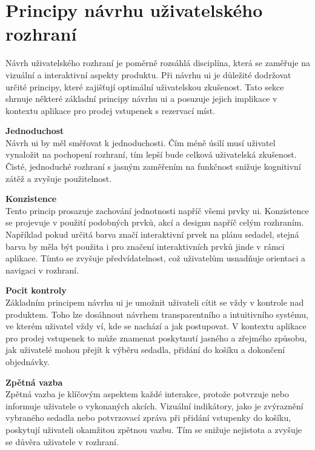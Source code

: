 \section{Principy návrhu uživatelského rozhraní}
\label{sec:navrh-uzivatelskeho-rozhrani-principy}
Návrh uživatelského rozhraní je poměrně rozsáhlá disciplína, která se zaměřuje na vizuální a interaktivní aspekty produktu.
Při návrhu \ac{ui} je důležité dodržovat určité principy, které zajišťují optimální uživatelskou zkušenost.
Tato sekce shrnuje některé základní principy návrhu \ac{ui} a posuzuje jejich implikace v kontextu aplikace pro prodej vstupenek s rezervací míst.

\textbf{Jednoduchost}\\
Návrh \ac{ui} by měl směřovat k jednoduchosti.
Čím méně úsilí musí uživatel vynaložit na pochopení rozhraní, tím lepší bude celková uživatelská zkušenost.
Čisté, jednoduché rozhraní s jasným zaměřením na funkčnost snižuje kognitivní zátěž a zvyšuje použitelnost\cite{d_resources_ui_design_principles}.

\textbf{Konzistence}\\
Tento princip prosazuje zachování jednotnosti napříč všemi prvky \ac{ui}.
Konzistence se projevuje v použití podobných prvků, akcí a designu napříč celým rozhraním\cite{d_resources_ui_design_principles}.
Například pokud určitá barva značí interaktivní prvek na plánu sedadel, stejná barva by měla být použita i pro značení interaktivních prvků jinde v rámci aplikace.
Tímto se zvyšuje předvídatelnost, což uživatelům usnadňuje orientaci a navigaci v rozhraní.

\textbf{Pocit kontroly}\\
Základním principem návrhu \ac{ui} je umožnit uživateli cítit se vždy v kontrole nad produktem.
Toho lze dosáhnout návrhem transparentního a intuitivního systému, ve kterém uživatel vždy ví, kde se nachází a jak postupovat\cite{d_resources_ui_design_principles}.
V kontextu aplikace pro prodej vstupenek to může znamenat poskytnutí jasného a zřejmého způsobu, jak uživatelé mohou přejít k výběru sedadla, přidání do košíku a dokončení objednávky.

\textbf{Zpětná vazba}\\
Zpětná vazba je klíčovým aspektem každé interakce, protože potvrzuje nebo informuje uživatele o vykonaných akcích\cite{d_resources_ui_design_principles}.
Vizuální indikátory, jako je zvýraznění vybraného sedadla nebo potvrzovací zpráva při přidání vstupenky do košíku, poskytují uživateli okamžitou zpětnou vazbu.
Tím se snižuje nejistota a zvyšuje se důvěra uživatele v rozhraní.

